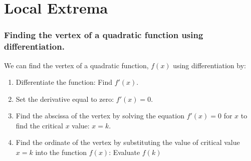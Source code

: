 \documentclass[20150903-160354-rs2.2-MarksMathNotebook.tex]{subfiles}
\begin{document}
%
%

\chapter{Local Extrema}



\subsection{Finding the vertex of a quadratic function using differentiation.}

We can find the vertex of a quadratic function, $f(x)$ using differentiation by:

\begin{enumerate}
\item Differentiate the function: Find $f'(x)$.
\item Set the derivative equal to zero: $f'(x)=0$.
\item Find the abscissa of the vertex by solving the equation $f'(x)=0$ for $x$ to find the critical $x$ value: $x=k$.
\item Find the ordinate of the vertex by substituting the value of critical value $x=k$ into the function $f(x)$: Evaluate $f(k)$
\end{enumerate}
\end{document}
